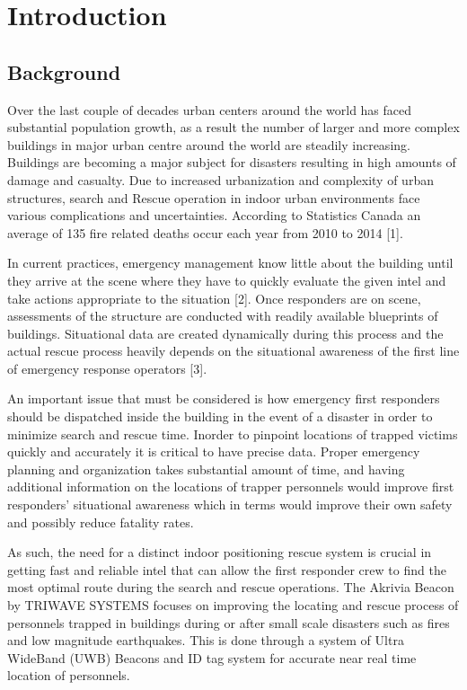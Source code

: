 %


\setcounter{section}{0}
\section{Introduction}
\bigskip
\subsection{Background}
Over the last couple of decades urban centers around the world has faced substantial population growth, as a result the number of larger and more complex buildings in major urban centre around the world are steadily increasing. Buildings are becoming a major subject for disasters resulting in high amounts of damage and casualty. Due to increased urbanization and complexity of urban structures, search and Rescue operation in indoor urban environments face various complications and uncertainties. According to Statistics Canada an average of 135 fire related deaths occur each year from 2010 to 2014 [1].

\bigskip
In current practices, emergency management know little about the building until they arrive at the scene where they have to quickly evaluate the given intel and take actions appropriate to the situation [2]. Once responders are on scene, assessments of the structure are conducted with readily available blueprints of buildings. Situational data are created dynamically during this process and the actual rescue process heavily depends on the situational awareness of the first line of emergency response operators [3]. 

\bigskip
An important issue that must be considered is how emergency first responders should be dispatched inside the building in the event of a disaster in order to minimize search and rescue time. Inorder to pinpoint locations of trapped victims quickly and accurately it is critical to have precise data. Proper emergency planning and organization takes substantial amount of time, and having additional information on the locations of trapper personnels would improve first responders’ situational awareness which in terms would improve their own safety and possibly reduce fatality rates.

\bigskip
As such, the need for a distinct indoor positioning rescue system is crucial in getting fast and reliable intel that can allow the first responder crew to find the most optimal route during the search and rescue operations. The Akrivia Beacon by TRIWAVE SYSTEMS focuses on improving the locating and rescue process of personnels trapped in buildings during or after small scale disasters such as fires and low magnitude earthquakes. This is done through a system of Ultra WideBand (UWB) Beacons and ID tag system for accurate near real time location of personnels. 

